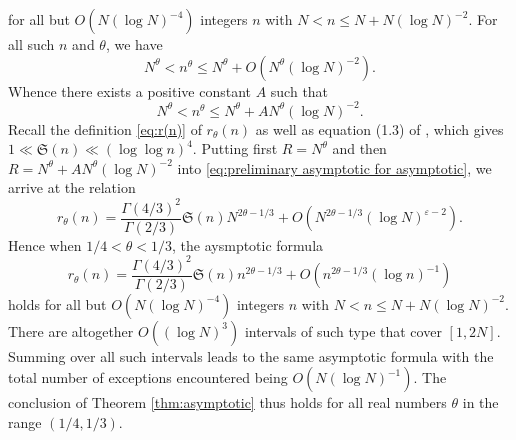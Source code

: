 \documentclass[12pt,english,reqno]{amsart}
\theoremstyle{definition}
\theoremstyle{remark}
\numberwithin{equation}{section}
\numberwithin{equation}{section}
\numberwithin{figure}{section}
\theoremstyle{plain}
\theoremstyle{plain}
\theoremstyle{plain}
\theoremstyle{plain}
\numberwithin{equation}{section}
\numberwithin{thm}{section}
\begin{document}
for all but $O(N(\log N)^{-4})$ integers $n$ with $N<n\leq N+N(\log N)^{-2}$.
For all such $n$ and $\theta$, we have
\[
N^{\theta}<n^{\theta}\leq N^{\theta}+O(N^{\theta}(\log N)^{-2}).\]
Whence there exists a positive constant $A$ such that
\[
N^{\theta}<n^{\theta}\leq N^{\theta}+AN^{\theta}(\log N)^{-2}.\]
Recall the definition \eqref{eq:r(n)} of $r_{\theta}(n)$ as well
as equation (1.3) of \cite{kawada1996}, which gives $1\ll\mathfrak{S}(n)\ll(\log\log n)^{4}$.
Putting first $R=N^{\theta}$ and then $R=N^{\theta}+AN^{\theta}(\log N)^{-2}$
into \eqref{eq:preliminary asymptotic for asymptotic}, we arrive
at the relation
\[
r_{\theta}(n)=\frac{\Gamma(4/3)^{2}}{\Gamma(2/3)}\mathfrak{S}(n)N^{2\theta-1/3}+O(N^{2\theta-1/3}(\log N)^{\varepsilon-2}).\]
Hence when $1/4<\theta<1/3$, the aysmptotic formula\[
r_{\theta}(n)=\frac{\Gamma(4/3)^{2}}{\Gamma(2/3)}\mathfrak{S}(n)n^{2\theta-1/3}+O(n^{2\theta-1/3}(\log n)^{-1})\]
holds for all but $O(N(\log N)^{-4})$ integers $n$ with $N<n\leq N+N(\log N)^{-2}$.
There are altogether $O((\log N)^{3})$ intervals of such type that
cover $[1,2N]$. Summing over all such intervals leads to the same
asymptotic formula with the total number of exceptions encountered
being $O(N(\log N)^{-1})$. The conclusion of Theorem \ref{thm:asymptotic}
thus holds for all real numbers $\theta$ in the range $(1/4,1/3)$.\[
\]
\end{document}
